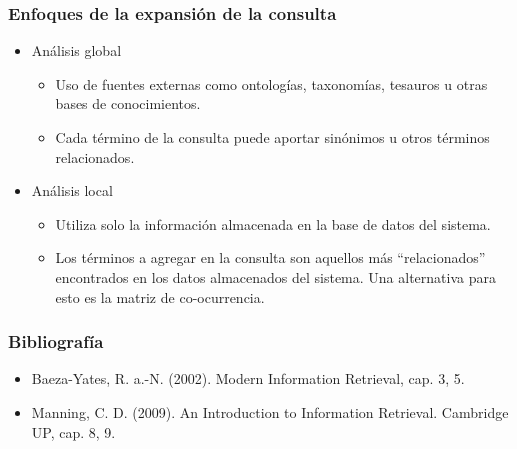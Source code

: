 \documentclass[
10pt, %
aspectratio=169, %
]{beamer}
\begin{document}
	\begin{frame}
		
		\frametitle{Enfoques de la expansión de la consulta}
		
		\begin{itemize}
			
			\item Análisis global 
			\begin{itemize}
				\item Uso de fuentes externas como ontologías,  taxonomías, tesauros u otras bases de conocimientos.	
				\item Cada término de la consulta puede aportar sinónimos u otros términos relacionados.
			\end{itemize}
			
			\vspace{2\baselineskip}
			
			\item Análisis local 
			\begin{itemize}
				\item Utiliza solo la información almacenada en la base de datos del sistema.
				\item Los términos a agregar en la consulta son aquellos más ``relacionados'' encontrados en los datos almacenados del sistema. Una alternativa para esto es la matriz de co-ocurrencia.
			\end{itemize}
			
		\end{itemize}
		
	\end{frame}
	
	\begin{frame}
		
		\frametitle{Bibliografía}
		
		\begin{itemize}
			\item Baeza-Yates, R. a.-N. (2002). Modern Information Retrieval, cap. 3, 5.
			\item Manning, C. D. (2009). An Introduction to Information Retrieval. Cambridge UP, cap. 8, 9.
		\end{itemize}
		
	\end{frame}
	
	\begin{frame}
		\titlepage
	\end{frame}
	
	
	
\end{document}
